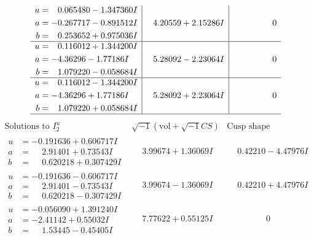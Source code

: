 \documentclass[1p]{elsarticle_modified}
\theoremstyle{definition}
\newcommand{\I}{\sqrt{-1}}
\begin{document}
$$\begin{array}{c|c|c}
\begin{aligned}
u &= \phantom{-}0.065480 - 1.347360 I \\
a &= -0.267717 - 0.891512 I \\
b &= \phantom{-}0.253652 + 0.975036 I\end{aligned}
 & \phantom{-}4.20559 + 2.15286 I & \phantom{-0.000000 } 0 \\ \hline\begin{aligned}
u &= \phantom{-}0.116012 + 1.344200 I \\
a &= -4.36296 - 1.77186 I \\
b &= \phantom{-}1.079220 - 0.058684 I\end{aligned}
 & \phantom{-}5.28092 - 2.23064 I & \phantom{-0.000000 } 0 \\ \hline\begin{aligned}
u &= \phantom{-}0.116012 - 1.344200 I \\
a &= -4.36296 + 1.77186 I \\
b &= \phantom{-}1.079220 + 0.058684 I\end{aligned}
 & \phantom{-}5.28092 + 2.23064 I & \phantom{-0.000000 } 0\\
 \hline 
 \end{array}$$\newpage$$\begin{array}{c|c|c}  
\text{Solutions to }I^u_{2}& \I (\text{vol} + \sqrt{-1}CS) & \text{Cusp shape}\\
 \hline 
\begin{aligned}
u &= -0.191636 + 0.606717 I \\
a &= \phantom{-}2.91401 + 0.73543 I \\
b &= \phantom{-}0.620218 + 0.307429 I\end{aligned}
 & \phantom{-}3.99674 + 1.36069 I & \phantom{-}0.42210 - 4.47976 I \\ \hline\begin{aligned}
u &= -0.191636 - 0.606717 I \\
a &= \phantom{-}2.91401 - 0.73543 I \\
b &= \phantom{-}0.620218 - 0.307429 I\end{aligned}
 & \phantom{-}3.99674 - 1.36069 I & \phantom{-}0.42210 + 4.47976 I \\ \hline\begin{aligned}
u &= -0.056090 + 1.391240 I \\
a &= -2.41142 + 0.55032 I \\
b &= \phantom{-}1.53445 - 0.45405 I\end{aligned}
 & \phantom{-}7.77622 + 0.55125 I & \phantom{-0.000000 } 0 \\ \hline\begin{aligned}

\end{aligned}
\end{array}$$
\end{document}
